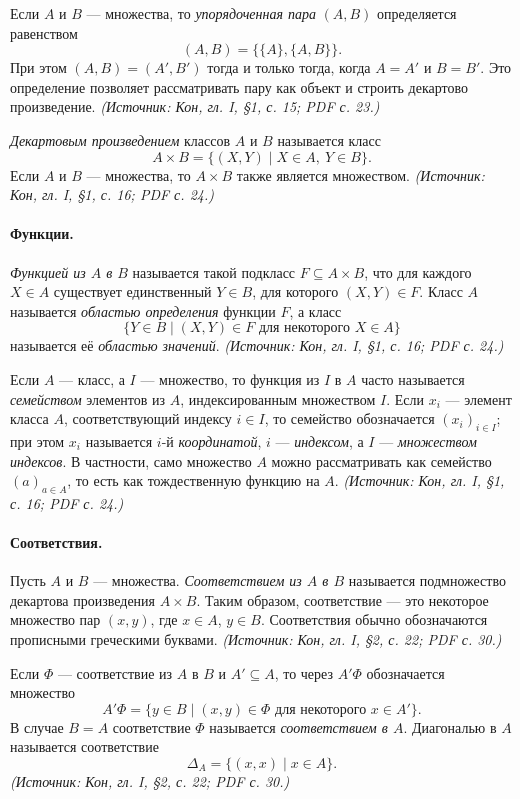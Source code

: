\documentclass[a4paper,12pt]{article}
\begin{document}
Если \(A\) и \(B\) — множества, то \emph{упорядоченная пара} \((A,B)\) определяется равенством
\[
(A,B)=\bigl\{\{A\},\{A,B\}\bigr\}.
\]
При этом \((A,B)=(A',B')\) тогда и только тогда, когда \(A=A'\) и \(B=B'\). Это определение позволяет рассматривать пару как объект и строить декартово произведение.
\textit{(Источник: Кон, гл. I, §1, с. 15; PDF с. 23.)}

\emph{Декартовым произведением} классов \(A\) и \(B\) называется класс
\[
A\times B=\{(X,Y)\mid X\in A,\ Y\in B\}.
\]
Если \(A\) и \(B\) — множества, то \(A\times B\) также является множеством.
\textit{(Источник: Кон, гл. I, §1, с. 16; PDF с. 24.)}

\paragraph{Функции.}
\emph{Функцией из \(A\) в \(B\)} называется такой подкласс \(F\subseteq A\times B\), что для каждого \(X\in A\) существует единственный \(Y\in B\), для которого \((X,Y)\in F\). Класс \(A\) называется \emph{областью определения} функции \(F\), а класс
\[
\{Y\in B\mid (X,Y)\in F\text{ для некоторого }X\in A\}
\]
называется её \emph{областью значений}.
\textit{(Источник: Кон, гл. I, §1, с. 16; PDF с. 24.)}

Если \(A\) — класс, а \(I\) — множество, то функция из \(I\) в \(A\) часто называется \emph{семейством} элементов из \(A\), индексированным множеством \(I\). Если \(x_i\) — элемент класса \(A\), соответствующий индексу \(i\in I\), то семейство обозначается \((x_i)_{i\in I}\); при этом \(x_i\) называется \(i\)-й \emph{координатой}, \(i\) — \emph{индексом}, а \(I\) — \emph{множеством индексов}. В частности, само множество \(A\) можно рассматривать как семейство \((a)_{a\in A}\), то есть как тождественную функцию на \(A\).
\textit{(Источник: Кон, гл. I, §1, с. 16; PDF с. 24.)}

\paragraph{Соответствия.}
Пусть \(A\) и \(B\) — множества. \emph{Соответствием из \(A\) в \(B\)} называется подмножество декартова произведения \(A\times B\). Таким образом, соответствие — это некоторое множество пар \((x,y)\), где \(x\in A\), \(y\in B\). Соответствия обычно обозначаются прописными греческими буквами.
\textit{(Источник: Кон, гл. I, §2, с. 22; PDF с. 30.)}

Если \(\Phi\) — соответствие из \(A\) в \(B\) и \(A'\subseteq A\), то через \(A'\Phi\) обозначается множество
\[
A'\Phi=\{y\in B\mid (x,y)\in\Phi\text{ для некоторого }x\in A'\}.
\]
В случае \(B=A\) соответствие \(\Phi\) называется \emph{соответствием в \(A\)}. Диагональю в \(A\) называется соответствие
\[
\Delta_A=\{(x,x)\mid x\in A\}.
\]
\textit{(Источник: Кон, гл. I, §2, с. 22; PDF с. 30.)}
\end{document}
